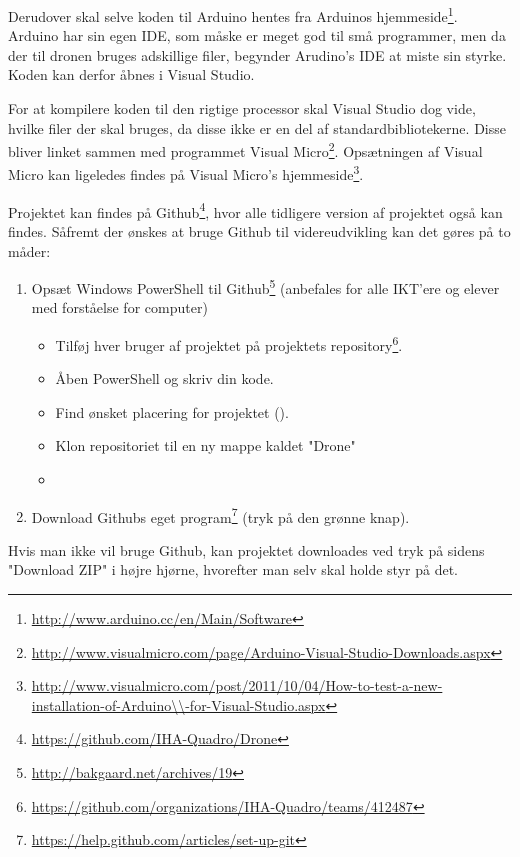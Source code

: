 \documentclass[Main]{subfiles}
\begin{document}
Derudover skal selve koden til Arduino hentes fra Arduinos hjemmeside\footnote{\url{http://www.arduino.cc/en/Main/Software}}.
Arduino har sin egen IDE, som måske er meget god til små programmer, men da der til dronen bruges adskillige filer, begynder Arudino's IDE at miste sin styrke.
Koden kan derfor åbnes i Visual Studio.

For at kompilere koden til den rigtige processor skal Visual Studio dog vide, hvilke filer der skal bruges, da disse ikke er en del af standardbibliotekerne.
Disse bliver linket sammen med programmet Visual Micro\footnote{\url{http://www.visualmicro.com/page/Arduino-Visual-Studio-Downloads.aspx}}.
Opsætningen af Visual Micro kan ligeledes findes på Visual Micro's hjemmeside\footnote{\url{http://www.visualmicro.com/post/2011/10/04/How-to-test-a-new-installation-of-Arduino\\-for-Visual-Studio.aspx}}.

Projektet kan findes på Github\footnote{\url{https://github.com/IHA-Quadro/Drone}}, hvor alle tidligere version af projektet også kan findes.
Såfremt der ønskes at bruge Github til videreudvikling kan det gøres på to måder:

\begin{enumerate}
\item Opsæt Windows PowerShell til Github\footnote{\url{http://bakgaard.net/archives/19}} (anbefales for alle IKT'ere og elever med forståelse for computer)
	\begin{itemize}
	\item Tilføj hver bruger af projektet på projektets repository\footnote{\url{https://github.com/organizations/IHA-Quadro/teams/412487}}.
	\item Åben PowerShell og skriv din kode.
	\item Find ønsket placering for projektet ().
	\item Klon repositoriet til en ny mappe kaldet "Drone" 
	\item[] 
	\end{itemize}
\item Download Githubs eget program\footnote{\url{https://help.github.com/articles/set-up-git}} (tryk på den grønne knap).
\end{enumerate}

Hvis man ikke vil bruge Github, kan projektet downloades ved tryk på sidens "Download ZIP"\xspace i højre hjørne, hvorefter man selv skal holde styr på det.
\end{document}
